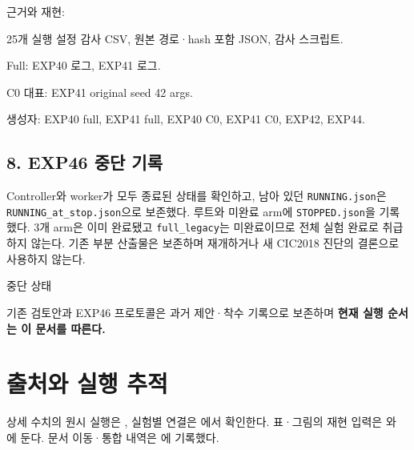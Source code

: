 근거와 재현:

\par\noindent \textbullet\enspace 25개 실행 설정 감사 CSV, 원본 경로·hash 포함 JSON, 감사 스크립트.


\par\noindent \textbullet\enspace Full: EXP40 로그, EXP41 로그.


\par\noindent \textbullet\enspace C0 대표: EXP41 original seed 42 args.


\par\noindent \textbullet\enspace 생성자: EXP40 full, EXP41 full, EXP40 C0, EXP41 C0, EXP42, EXP44.


\subsection{8. EXP46 중단 기록}
Controller와 worker가 모두 종료된 상태를 확인하고, 남아 있던 \texttt{RUNNING.\allowbreak{}json}은 \texttt{RUNNING\_\allowbreak{}\allowbreak{}at\_\allowbreak{}\allowbreak{}stop.\allowbreak{}json}으로 보존했다. 루트와 미완료 arm에 \texttt{STOPPED.\allowbreak{}json}을 기록했다. 3개 arm은 이미 완료됐고 \texttt{full\_\allowbreak{}\allowbreak{}leg\allowbreak{}acy}는 미완료이므로 전체 실험 완료로 취급하지 않는다. 기존 부분 산출물은 보존하며 재개하거나 새 CIC2018 진단의 결론으로 사용하지 않는다.

\par\noindent \textbullet\enspace 중단 상태


\par\noindent \textbullet\enspace 기존 검토안과 EXP46 프로토콜은 과거 제안·착수 기록으로 보존하며 \textbf{현재 실행 순서는 이 문서를 따른다.}




\section*{출처와 실행 추적}

상세 수치의 원시 실행은 , 실험별 연결은 에서 확인한다. 표·그림의 재현 입력은 와 에 둔다. 문서 이동·통합 내역은 에 기록했다.


